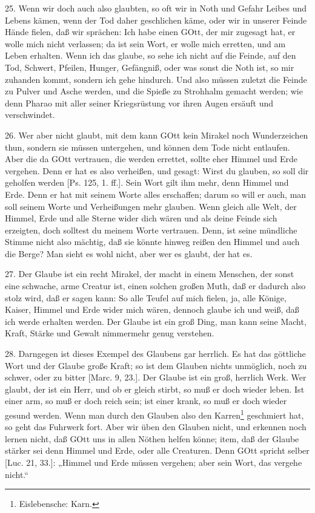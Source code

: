 25. Wenn wir doch auch also glaubten, so oft wir in Noth und Gefahr Leibes und Lebens kämen, wenn der Tod daher geschlichen käme, oder wir in unserer Feinde Hände fielen, daß wir sprächen: Ich habe einen GOtt, der mir zugesagt hat, er wolle mich nicht verlassen; da ist sein Wort, er wolle mich erretten, und am Leben erhalten. Wenn ich das glaube, so sehe ich nicht auf die Feinde, auf den Tod, Schwert, Pfeilen, Hunger, Gefängniß, oder was sonst die Noth ist, so mir zuhanden kommt, sondern ich gehe hindurch. Und also müssen zuletzt die Feinde zu Pulver und Asche werden, und die Spieße zu Strohhalm gemacht werden; wie denn Pharao mit aller seiner Kriegsrüstung vor ihren Augen ersäuft und verschwindet.

26. Wer aber nicht glaubt, mit dem kann GOtt kein Mirakel noch Wunderzeichen thun, sondern sie müssen untergehen, und können dem Tode nicht entlaufen. Aber die da GOtt vertrauen, die werden errettet, sollte eher Himmel und Erde vergehen. Denn er hat es also verheißen, und gesagt: Wirst du glauben, so soll dir geholfen werden [Ps. 125, 1. ff.]. Sein Wort gilt ihm mehr, denn Himmel und Erde. Denn er hat mit seinem Worte alles erschaffen; darum so will er auch, man soll seinem Worte und Verheißungen mehr glauben. Wenn gleich alle Welt, der Himmel, Erde und alle Sterne wider dich wären und als deine Feinde sich erzeigten, doch solltest du meinem Worte vertrauen. Denn, ist seine mündliche Stimme nicht also mächtig, daß sie könnte hinweg reißen den Himmel und auch die Berge? Man sieht es wohl nicht, aber wer es glaubt, der hat es.

27. Der Glaube ist ein recht Mirakel, der macht in einem Menschen, der sonst eine schwache, arme Creatur ist, einen solchen großen Muth, daß er dadurch also stolz wird, daß er sagen kann: So alle Teufel auf mich fielen, ja, alle Könige, Kaiser, Himmel und Erde wider mich wären, dennoch glaube ich und weiß, daß ich werde erhalten werden. Der Glaube ist ein groß Ding, man kann seine Macht, Kraft, Stärke und Gewalt nimmermehr genug verstehen.

28. Darngegen ist dieses Exempel des Glaubens gar herrlich. Es hat das göttliche Wort und der Glaube große Kraft; so ist dem Glauben nichts unmöglich, noch zu schwer, oder zu bitter [Marc. 9, 23.]. Der Glaube ist ein groß, herrlich Werk. Wer glaubt, der ist ein Herr, und ob er gleich stirbt, so muß er doch wieder leben. Ist einer arm, so muß er doch reich sein; ist einer krank, so muß er doch wieder gesund werden. Wenn man durch den Glauben also den Karren\footnote{Eislebensche: Karn.} geschmiert hat, so geht das Fuhrwerk fort. Aber wir üben den Glauben nicht,
und erkennen noch lernen nicht, daß GOtt uns in allen Nöthen helfen könne; item, daß der Glaube stärker sei denn Himmel und Erde, oder alle Creaturen. Denn GOtt spricht selber [Luc. 21, 33.]: „Himmel und Erde müssen vergehen; aber sein Wort, das vergehe nicht.“

